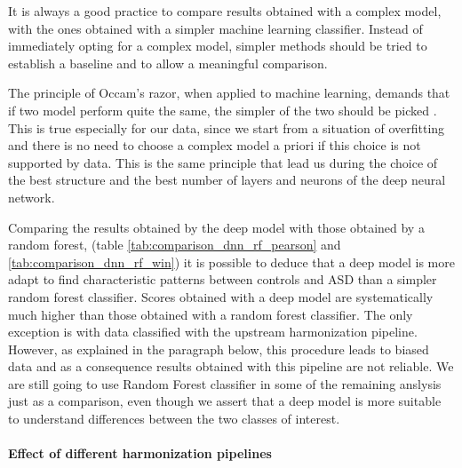 \documentclass[11pt]{report}
\begin{document}
\hfill

\noindent It is always a good practice to compare results obtained with a complex model, with the ones obtained with a simpler machine learning classifier.
Instead of immediately opting for a complex model, simpler methods should be tried to establish a baseline and to allow a meaningful comparison.

The principle of Occam's razor, when applied to machine learning, demands that if two model perform quite the same, the simpler of the two should be picked \cite{domingos-1999}.
This is true especially for our data, since we start from a situation of overfitting and there is no need to choose a complex model a priori if this choice is not supported by data.
This is the same principle that lead us during the choice of the best structure and the best number of layers and neurons of the deep neural network.

Comparing the results obtained by the deep model with those obtained by a random forest, (table \ref{tab:comparison_dnn_rf_pearson} and \ref{tab:comparison_dnn_rf_win}) it is possible to deduce that a deep model is more adapt to find characteristic patterns between controls and ASD than a simpler random forest classifier.
Scores obtained with a deep model are systematically much higher than those obtained with a random forest classifier.
The only exception is with data classified with the upstream harmonization pipeline.
However, as explained in the paragraph below, this procedure leads to biased data and as a consequence results obtained with this pipeline are not reliable.
We are still going to use Random Forest classifier in some of the remaining anslysis just as a comparison, even though we assert that a deep model is more suitable to understand differences between the two classes of interest.

\paragraph{Effect of different harmonization pipelines} 

\hfill 
\end{document}
